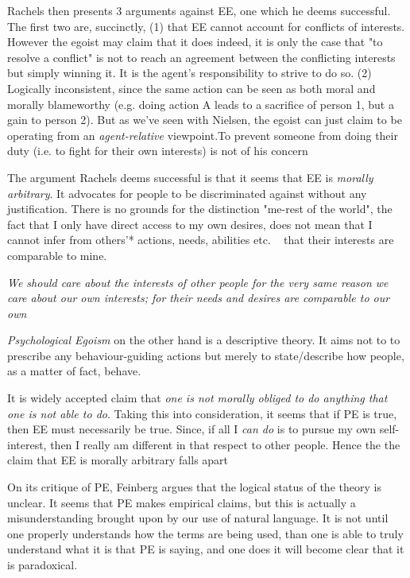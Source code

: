 \documentclass[english,course]{Notes}
\newcommand{\ita}[1]{\textit{#1}}
\newcommand\quo[1]{\begin{displayquote}\ita{\large{#1}}\end{displayquote}}
\begin{document}
\par{Rachels then presents 3 arguments against EE, one which he deems successful. The first two are, succinctly, (1) that EE cannot account for conflicts of interests. However the egoist may claim that it does indeed, it is only the case that "to resolve a conflict" is not to reach an agreement between the conflicting interests but simply winning it. It is the agent's responsibility to strive to do so. (2) Logically inconsistent, since the same action can be seen as both moral and morally blameworthy (e.g. doing action A leads to a sacrifice of person 1, but a gain to person 2). But as we've seen with Nielsen, the egoist can just claim to be operating from an \ita{agent-relative} viewpoint.To prevent someone from doing their duty (i.e. to fight for their own interests) is not of his concern}

\par{The argument Rachels deems successful is that it seems that EE is \ita{morally arbitrary}. It advocates for people to be discriminated against without any justification. There is no grounds for the distinction "me-rest of the world", the fact that I only have direct access to my own desires, does not mean that I cannot infer from others'* actions, needs, abilities etc. ~ that their interests are comparable to mine.}

\quo{We should care about the interests of other people
for the very same reason we care about our own interests;
for their needs and desires are comparable to our own}

\par{\ita{Psychological Egoism} on the other hand is a descriptive theory. It aims not to to prescribe any behaviour-guiding actions but merely to state/describe how people, as a matter of fact, behave.}

\par{It is widely accepted claim that \ita{one is not morally obliged to do anything that one is not able to do}. Taking this into consideration, it seems that if PE is true, then EE must necessarily be true. Since, if all I \ita{can do} is to pursue my own self-interest, then I really am different in that respect to other people. Hence the the claim that EE is morally arbitrary falls apart}

\par{On its critique of PE, Feinberg argues that the logical status of the theory is unclear. It seems that  PE makes empirical claims, but this is actually a misunderstanding brought upon by our use of natural language. It is not until one properly understands how the terms are being used, than one is able to truly understand what it is that PE is saying, and one does it will become clear that it is paradoxical.}
\end{document}
